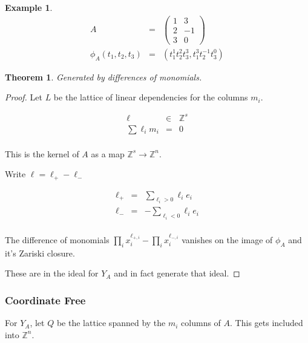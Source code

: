 \documentclass[11pt]{book}
\theoremstyle{change}
\newtheorem{theorem}[equation]{Theorem}
\newtheorem{example}[equation]{Example}
\theoremstyle{nonumberplain}
\newtheorem{proof}{Proof}
\numberwithin{equation}{section}
\begin{document}
\begin{example}
\begin{eqnarray*}
A &=& \begin{pmatrix}
1 & 3\\
2 & -1\\
3 & 0
\end{pmatrix}\\
\phi_A (t_1 , t_2 , t_3 ) &=& (t_1^1 t_2^2 t_3^3 , t_1^3 t_2^{-1} t_3^0 )
\end{eqnarray*}
\end{example}

\begin{theorem}
Generated by differences of monomials.
\end{theorem}

\begin{proof}
Let $L$ be the lattice of linear dependencies for the columns $m_i$.

\begin{eqnarray*}
\ell &\in& \mathbb{Z}^s\\
\sum \ell_i m_i &=& 0\\
\end{eqnarray*}

This is the kernel of $A$ as a map $\mathbb{Z}^s \to \mathbb{Z}^n$.

Write $\ell = \ell_+ - \ell_-$

\begin{eqnarray*}
\ell_+ &=& \sum_{\ell_i > 0} \ell_i e_i\\
\ell_- &=& - \sum_{\ell_i < 0} \ell_i e_i\\
\end{eqnarray*}

The difference of monomials $\prod_i x_i^{\ell_{+,i}} - \prod_i x_i^{\ell_{-,i}}$ vanishes on the image of $\phi_A$ and it's Zariski closure.

These are in the ideal for $Y_A$ and in fact generate that ideal.

\end{proof}

\subsubsection{Coordinate Free}

For $Y_A$, let $Q$ be the lattice spanned by the $m_i$ columns of $A$. This gets included into $\mathbb{Z}^n$.

\begin{center}
\end{center}
\end{document}

